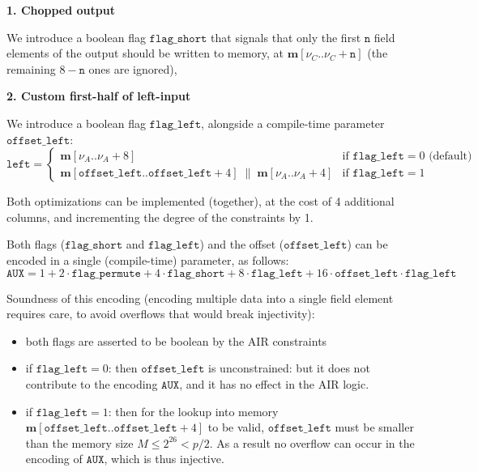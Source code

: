 \documentclass{article}
\theoremstyle{definition}
\begin{document}
\vspace{5mm}

\textbf{1. Chopped output}

We introduce a boolean flag $\texttt{flag\_short}$ that signals that only the first $\texttt{n}$ field elements of the output should be written to memory, at $\textbf{m}[\nu_C..\nu_C + \texttt{n}]$ (the remaining $8 - \texttt{n}$ ones are ignored), 

\vspace{5mm}

\textbf{2. Custom first-half of left-input}

We introduce a boolean flag $\texttt{flag\_left}$, alongside a compile-time parameter $\texttt{offset\_left}$:
$$\texttt{left} = \begin{cases} \textbf{m}[\nu_A..\nu_A + 8] & \text{if } \texttt{flag\_left} = 0 \text{ (default)} \\ \textbf{m}[\texttt{offset\_left}..\texttt{offset\_left} + 4] \;\|\; \textbf{m}[\nu_A..\nu_A + 4] & \text{if } \texttt{flag\_left} = 1 \end{cases}$$

\vspace{5mm}

Both optimizations can be implemented (together), at the cost of 4 additional columns, and incrementing the degree of the constraints by 1.

Both flags ($\texttt{flag\_short}$ and $\texttt{flag\_left}$) and the offset ($\texttt{offset\_left}$) can be encoded in a single (compile-time) parameter, as follows:
$$\texttt{AUX} = 1 + 2 \cdot \texttt{flag\_permute} + 4 \cdot \texttt{flag\_short} + 8 \cdot \texttt{flag\_left} + 16 \cdot \texttt{offset\_left} \cdot  \texttt{flag\_left}$$

Soundness of this encoding (encoding multiple data into a single field element requires care, to avoid overflows that would break injectivity):
\begin{itemize}
    \item both flags are asserted to be boolean by the AIR constraints
    \item if $\texttt{flag\_left} = 0$: then $\texttt{offset\_left}$ is unconstrained: but it does not contribute to the encoding $\texttt{AUX}$, and it has no effect in the AIR logic.
    \item if $\texttt{flag\_left} = 1$: then for the lookup into memory $\textbf{m}[\texttt{offset\_left}..\texttt{offset\_left} + 4]$ to be valid, $\texttt{offset\_left}$ must be smaller than the memory size $M \leq 2^{26} < p / 2$. As a result no overflow can occur in the encoding of $\texttt{AUX}$, which is thus injective.
\end{itemize}
\end{document}
